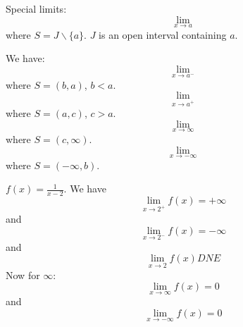 \documentclass{report}
\begin{document}
Special limits:
    \begin{equation*}
        \lim\limits_{x \to a}
    \end{equation*}
where $S = J\backslash\{a\}$. $J$ is an open interval containing $a$.

We have:
    \begin{equation*}
        \lim\limits_{x \to a^{-}}
    \end{equation*}
where $S = (b, a)$, $b < a$. 
    \begin{equation*}
        \lim\limits_{x \to a^{+}}
    \end{equation*}
where $S = (a, c)$, $c > a$.
    \begin{equation*}
        \lim\limits_{x \to \infty}
    \end{equation*}
where $S = (c, \infty)$.
    \begin{equation*}
        \lim\limits_{x \to -\infty}
    \end{equation*}
where $S = (-\infty, b)$.

\begin{examples}
    \begin{example}
        $f(x) = \frac{1}{x - 2}$. We have
            \begin{equation*}
                \lim\limits_{x \to 2^{+}}f(x) = +\infty
            \end{equation*}
        and
            \begin{equation*}
                \lim\limits_{x \to 2^{-}}f(x) = -\infty
            \end{equation*}
        and
            \begin{equation*}
                \lim\limits_{x \to 2}f(x) DNE
            \end{equation*}
        Now for $\infty$:
            \begin{equation*}
                \lim\limits_{x \to \infty} f(x) = 0
            \end{equation*}
        and
            \begin{equation*}
                \lim\limits_{x \to -\infty} f(x) = 0
            \end{equation*}
    \end{example}
\end{examples}
\end{document}
